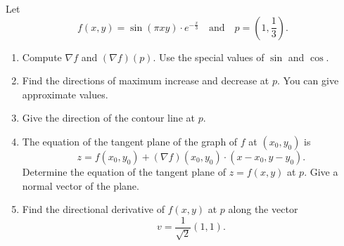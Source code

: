 \begin{exercise}
	Let
	$$
		f(x,y) = \sin(\pi xy) \cdot e^{-\frac{x}{3}} \quad \text{and} \quad p = \left(1, \frac{1}{3}\right).
	$$
	\begin{enumerate}
		\item Compute $\nabla f$ and $(\nabla f)(p)$. Use the special values of $\sin$ and $\cos$.
		\item Find the directions of maximum increase and decrease at $p$. You can give approximate values.
		\item Give the direction of the contour line at $p$.
		\item The equation of the tangent plane of the graph of $f$ at $(x_0, y_0)$ is
		      $$
			      z = f(x_0, y_0) + (\nabla f)(x_0, y_0) \cdot (x - x_0, y - y_0).
		      $$
		      Determine the equation of the tangent plane of $z = f(x,y)$ at $p$. Give a normal vector of the plane.
		\item Find the directional derivative of $f(x,y)$ at $p$ along the vector
		      $$
			      v = \frac{1}{\sqrt{2}} (1,1).
		      $$
	\end{enumerate}
\end{exercise}

